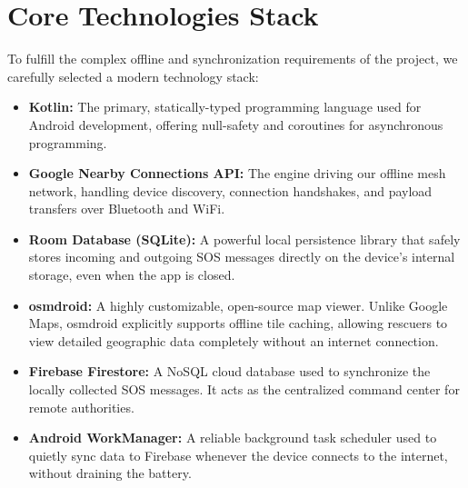 \section{Core Technologies Stack}
To fulfill the complex offline and synchronization requirements of the project, we carefully selected a modern technology stack:
\begin{itemize}
    \item \textbf{Kotlin:} The primary, statically-typed programming language used for Android development, offering null-safety and coroutines for asynchronous programming.
    \item \textbf{Google Nearby Connections API:} The engine driving our offline mesh network, handling device discovery, connection handshakes, and payload transfers over Bluetooth and WiFi.
    \item \textbf{Room Database (SQLite):} A powerful local persistence library that safely stores incoming and outgoing SOS messages directly on the device's internal storage, even when the app is closed.
    \item \textbf{osmdroid:} A highly customizable, open-source map viewer. Unlike Google Maps, osmdroid explicitly supports offline tile caching, allowing rescuers to view detailed geographic data completely without an internet connection.
    \item \textbf{Firebase Firestore:} A NoSQL cloud database used to synchronize the locally collected SOS messages. It acts as the centralized command center for remote authorities.
    \item \textbf{Android WorkManager:} A reliable background task scheduler used to quietly sync data to Firebase whenever the device connects to the internet, without draining the battery.
\end{itemize}

